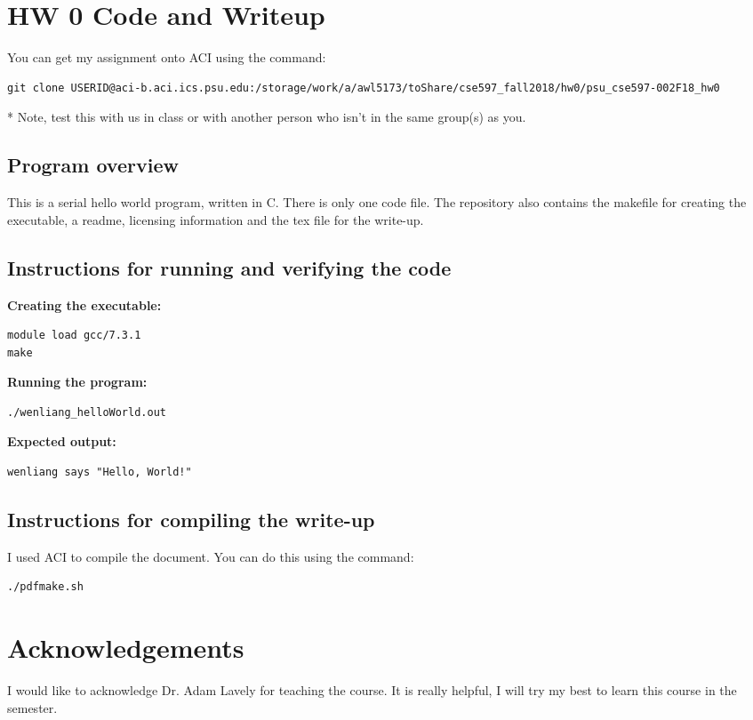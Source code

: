 \documentclass{article}
\begin{document}
\begin{spacing}{1.1}
\section{HW 0 Code and Writeup}

You can get my assignment onto ACI using the command:

\begin{verbatim}
git clone USERID@aci-b.aci.ics.psu.edu:/storage/work/a/awl5173/toShare/cse597_fall2018/hw0/psu_cse597-002F18_hw0
\end{verbatim}

* Note, test this with us in class or with another person who isn't in the same group(s) as you.

\subsection{Program overview}

This is a serial hello world program, written in C. There is only one code file. The repository also contains the makefile for creating the executable, a readme, licensing information and the tex file for the write-up.


\subsection{Instructions for running and verifying the code}

\textbf{Creating the executable:}
\begin{verbatim}
module load gcc/7.3.1
make
\end{verbatim}

\textbf{Running the program:}
\begin{verbatim}
./wenliang_helloWorld.out
\end{verbatim}

\textbf{Expected output:}
\begin{verbatim}
wenliang says "Hello, World!"
\end{verbatim}

\subsection{Instructions for compiling the write-up}

I used ACI to compile the document.  You can do this using the command:
\begin{verbatim}
./pdfmake.sh
\end{verbatim}

\section{Acknowledgements}

I would like to acknowledge Dr. Adam Lavely for teaching the course. It is really helpful, I will try my best to learn this course in the semester.





\end{spacing}
\end{document}
